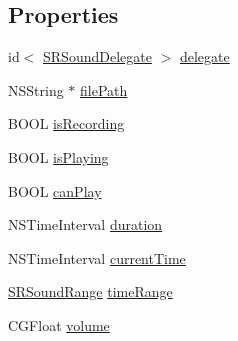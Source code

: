 \subsection*{Properties}
\begin{DoxyCompactItemize}
\item 
id$<$ \hyperlink{protocol_s_r_sound_delegate-p}{S\-R\-Sound\-Delegate} $>$ \hyperlink{interface_s_e_sound_a5e5c016dc31e60d35799f5535f6afa7b}{delegate}
\item 
N\-S\-String $\ast$ \hyperlink{interface_s_e_sound_a327bbd5dab8c522b7de7aa2ad16dc06c}{file\-Path}
\item 
B\-O\-O\-L \hyperlink{interface_s_e_sound_a41964b206d9ff678df2d0c5d74b6e681}{is\-Recording}
\item 
B\-O\-O\-L \hyperlink{interface_s_e_sound_ab5115756f4a98bbc401df59353b513b7}{is\-Playing}
\item 
B\-O\-O\-L \hyperlink{interface_s_e_sound_a987f2a9cce1f3a3a9c888358acf80649}{can\-Play}
\item 
N\-S\-Time\-Interval \hyperlink{interface_s_e_sound_a0641c721c6b3c998eb56ed060b421bad}{duration}
\item 
N\-S\-Time\-Interval \hyperlink{interface_s_e_sound_ad05f292aa572613e1012562a4c713e04}{current\-Time}
\item 
\hyperlink{struct_s_r_sound_range}{S\-R\-Sound\-Range} \hyperlink{interface_s_e_sound_a9c74b48a63dd95bb49ab983a48fd44c9}{time\-Range}
\item 
C\-G\-Float \hyperlink{interface_s_e_sound_aeab4aed9c6ce82c40e7dbbe9de8294f6}{volume}
\end{DoxyCompactItemize}


